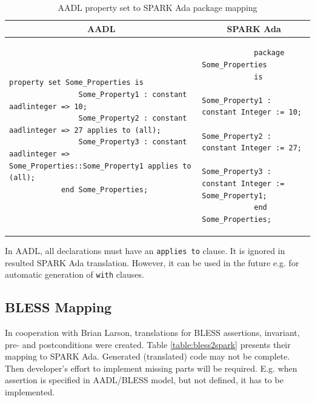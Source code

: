 \singlespacing
\begin{table}[!ht]
	\caption{AADL property set to SPARK Ada package mapping}
	\label{table:propertyset_mapping}
	\centering
  	\begin{tabular}{ | p{3in} | p{3in} |}

		\hline
		\multicolumn{1}{|c|}{\textbf{AADL}} & \multicolumn{1}{|c|}{\textbf{SPARK Ada}} \\ \hline

		\begin{lstlisting}[language=aadl]
			property set Some_Properties is
				Some_Property1 : constant aadlinteger => 10;
				Some_Property2 : constant aadlinteger => 27 applies to (all);
				Some_Property3 : constant aadlinteger => Some_Properties::Some_Property1 applies to (all);
			end Some_Properties;
		\end{lstlisting} 
		& 
		\begin{lstlisting}
			package Some_Properties
			is
				Some_Property1 : constant Integer := 10;
				Some_Property2 : constant Integer := 27;
				Some_Property3 : constant Integer := Some_Property1;
			end Some_Properties;
		\end{lstlisting} 		

		\\ \hline
	\end{tabular}
\end{table}
\doublespacing

In AADL, all declarations must have an \lstinline{applies to} clause. It is ignored in resulted SPARK Ada translation. However, it can be used in the future e.g. for automatic generation of \lstinline{with} clauses.


\subsection{BLESS Mapping}
\label{codegen:mapping:bless}

In cooperation with Brian Larson, translations for BLESS assertions, invariant, pre- and postconditions were created. Table \ref{table:bless2spark} presents their mapping to SPARK Ada. Generated (translated) code may not be complete. Then developer's effort to implement missing parts will be required. E.g. when assertion is specified in AADL/BLESS model, but not defined, it has to be implemented.

